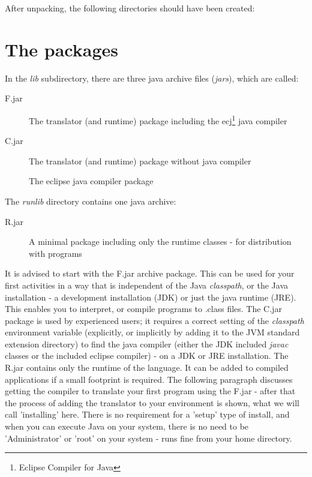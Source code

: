After unpacking, the following directories should have been created:
\section{The \nr{} packages}
In the \emph{lib} subdirectory, there are three java archive files
(\emph{jars}), which are called:

\begin{description}
\item[\nr{}F.jar] The translator (and runtime) package including the
  ecj\footnote{Eclipse Compiler for Java} java compiler
\item[\nr{}C.jar] The translator (and runtime) package without java
  compiler
\item[\ecjjarname{}] The eclipse java compiler package
\end{description}

The \emph{runlib} directory contains one java archive:
\begin{description}
\item[\nr{}R.jar] A minimal package including only the runtime
  \nr{} classes - for distribution with \nr{} programs
\end{description}
It is advised to start with the \nr{}F.jar archive package. This can
be used for your first \nr{} activities in a way that is independent
of the Java \emph{classpath}, or the Java installation - a development
installation (JDK) or just the java runtime (JRE). This enables you to interpret, or
compile \nr{} programs to .class files. The \nr{}C.jar package is
used by experienced \nr{} users; it requires a correct setting of
the \emph{classpath} environment variable (explicitly, or implicitly
by adding it to the JVM standard extension directory) to find the java
compiler (either the JDK included \emph{javac} classes or the included
eclipse compiler) - on a JDK or JRE installation. The \nr{}R.jar
contains only the runtime of the \nr{} language. It can be added to
compiled \nr{} applications if a small footprint is required. The
following paragraph discusses getting the compiler to translate your
first program using the \nr{}F.jar - after that the process of
adding the translator to your environment is shown, what we will call
'installing' here. There is no requirement for a 'setup' type of
install, and when you can execute Java on your system, there is no
need to be 'Administrator' or 'root' on your system - \nr{} runs
fine from your home directory.

